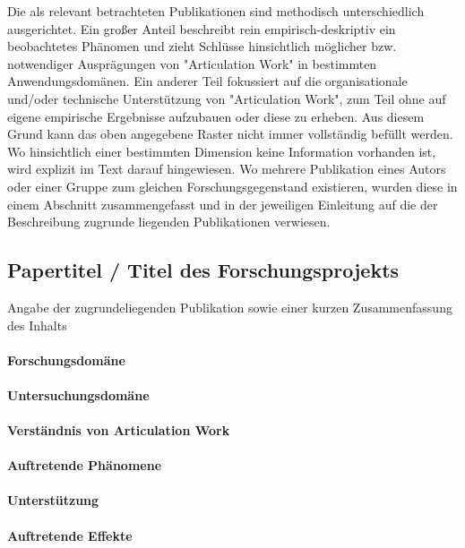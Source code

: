 Die als relevant betrachteten Publikationen sind methodisch unterschiedlich ausgerichtet. Ein großer Anteil beschreibt rein empirisch-deskriptiv ein beobachtetes Phänomen und zieht Schlüsse hinsichtlich möglicher bzw. notwendiger Ausprägungen von "Articulation Work" in bestimmten Anwendungsdomänen. Ein anderer Teil fokussiert auf die organisationale und/oder technische Unterstützung von "Articulation Work", zum Teil ohne auf eigene empirische Ergebnisse aufzubauen oder diese zu erheben. Aus diesem Grund kann das oben angegebene Raster nicht immer vollständig befüllt werden. Wo hinsichtlich einer bestimmten Dimension keine Information vorhanden ist, wird explizit im Text darauf hingewiesen. Wo mehrere Publikation eines Autors oder einer Gruppe zum gleichen Forschungsgegenstand existieren, wurden diese in einem Abschnitt zusammengefasst und in der jeweiligen Einleitung auf die der Beschreibung zugrunde liegenden Publikationen verwiesen.


\citep{Fjuk97}
\subsection{Papertitel / Titel des Forschungsprojekts}

Angabe der zugrundeliegenden Publikation sowie einer kurzen Zusammenfassung des Inhalts

\paragraph{Forschungsdomäne}

\paragraph{Untersuchungsdomäne}

\paragraph{Verständnis von Articulation Work}

\paragraph{Auftretende Phänomene}

\paragraph{Unterstützung}

\paragraph{Auftretende Effekte}

